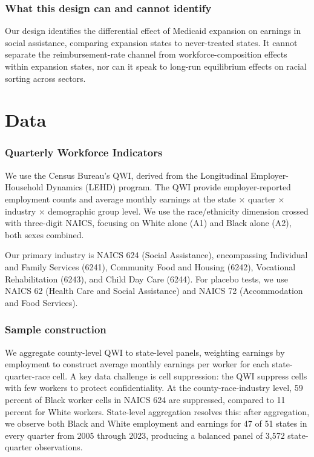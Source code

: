 \documentclass[12pt]{article}
\begin{document}
\subsubsection*{What this design can and cannot identify} Our design identifies the differential effect of Medicaid expansion on earnings in social assistance, comparing expansion states to never-treated states. It cannot separate the reimbursement-rate channel from workforce-composition effects within expansion states, nor can it speak to long-run equilibrium effects on racial sorting across sectors.

\section{Data}

\subsubsection*{Quarterly Workforce Indicators} We use the Census Bureau's QWI, derived from the Longitudinal Employer-Household Dynamics (LEHD) program. The QWI provide employer-reported employment counts and average monthly earnings at the state $\times$ quarter $\times$ industry $\times$ demographic group level. We use the race/ethnicity dimension crossed with three-digit NAICS, focusing on White alone (A1) and Black alone (A2), both sexes combined.

Our primary industry is NAICS 624 (Social Assistance), encompassing Individual and Family Services (6241), Community Food and Housing (6242), Vocational Rehabilitation (6243), and Child Day Care (6244). For placebo tests, we use NAICS 62 (Health Care and Social Assistance) and NAICS 72 (Accommodation and Food Services).

\subsubsection*{Sample construction} We aggregate county-level QWI to state-level panels, weighting earnings by employment to construct average monthly earnings per worker for each state-quarter-race cell. A key data challenge is cell suppression: the QWI suppress cells with few workers to protect confidentiality. At the county-race-industry level, 59 percent of Black worker cells in NAICS 624 are suppressed, compared to 11 percent for White workers. State-level aggregation resolves this: after aggregation, we observe both Black and White employment and earnings for 47 of 51 states in every quarter from 2005 through 2023, producing a balanced panel of 3,572 state-quarter observations.
\end{document}
